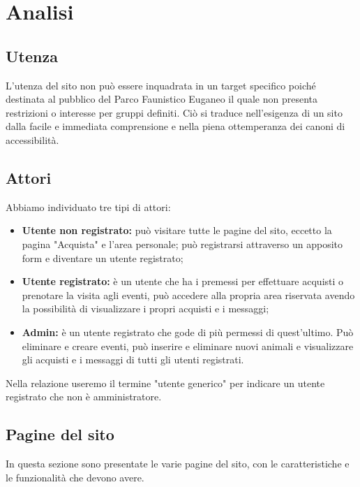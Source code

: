 \section{Analisi}

    \subsection{Utenza}
        L'utenza del sito non può essere inquadrata in un target specifico poiché destinata al pubblico del Parco Faunistico Euganeo il quale non presenta restrizioni o interesse per gruppi definiti. Ciò si traduce nell'esigenza di un sito dalla facile e immediata comprensione e nella piena ottemperanza dei canoni di accessibilità.

    \subsection{Attori}
        Abbiamo individuato tre tipi di attori:
        \begin{itemize}
            \item \textbf{Utente non registrato:} può visitare tutte le pagine del sito, eccetto la pagina "Acquista" e l'area personale; può registrarsi attraverso un apposito form e diventare un utente registrato;
            \item \textbf{Utente registrato:} è un utente che ha i premessi per effettuare acquisti o prenotare la visita agli eventi, può accedere alla propria area riservata avendo la possibilità di visualizzare i propri acquisti e i messaggi;
            \item \textbf{Admin:} è un utente registrato che gode di più permessi di quest'ultimo. Può eliminare e creare eventi, può inserire e eliminare nuovi animali e visualizzare gli acquisti e i messaggi di tutti gli utenti registrati.
        \end{itemize}
        Nella relazione useremo il termine "utente generico" per indicare un utente registrato che non è amministratore.

    \subsection{Pagine del sito}
        In questa sezione sono presentate le varie pagine del sito, con le caratteristiche e le funzionalità che devono avere.
